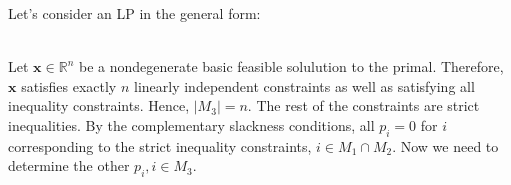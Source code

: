 \documentclass{article}
\begin{document}
Let's consider an LP in the general form:

\begin{Parallel}[v]{0.48\textwidth}{0.4\textwidth}
\ParallelPar
\end{Parallel}

\noindent \\
Let $\mathbf{x} \in \mathbb{R}^n$ be a nondegenerate basic feasible solulution to the primal.  Therefore, $\mathbf{x}$ satisfies exactly $n$ linearly independent constraints as well as satisfying all inequality constraints.  Hence, $|M_3| = n.$  The rest of the constraints are strict inequalities. By the complementary slackness conditions, all $p_i  = 0$ for $i$ corresponding to the strict inequality constraints, $i \in M_1 \cap M_2$.  Now we need to determine the other $p_i, i \in M_3$.  \\  
\end{document}
